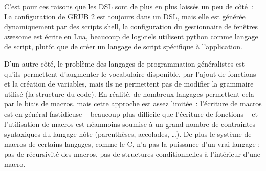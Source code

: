 \documentclass{article}
\begin{document}
C'est pour ces raisons que les DSL sont de plus en plus laissés un peu de côté~: La configuration de GRUB 2 est toujours dans un DSL, mais
elle est générée dynamiquement par des scripts shell\cite{config-grub}, la configuration du gestionnaire de fenêtres awesome est écrite en
Lua\cite{config-awesome}, beaucoup de logiciels utilisent python comme langage de script, plutôt que de créer un langage de script
spécifique à l'application.

D'un autre côté, le problème des langages de programmation généralistes est qu'ils permettent d'augmenter le vocabulaire disponible, par
l'ajout de fonctions et la création de variables, mais ils ne permettent pas de modifier la grammaire utilisé (la structure du code). En
réalité, de nombreux langages permettent cela par le biais de macros, mais cette approche est assez limitée~: l'écriture de macros est en
général fastidieuse -- beaucoup plus difficile que l'écriture de fonctions -- et l'utilisation de macros est néanmoins soumise à un grand
nombre de contraintes syntaxiques du langage hôte (parenthèses, accolades, \dots). De plus le système de macros de certains langages, comme
le C, n'a pas la puissance d'un vrai langage : pas de récursivité des macros, pas de structures conditionnelles à l'intérieur d'une macro.
\end{document}
